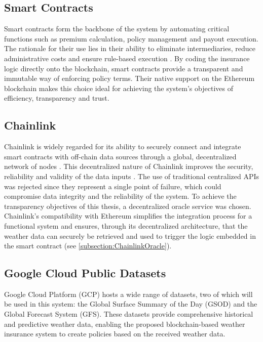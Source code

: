 \subsection{Smart Contracts}
Smart contracts form the backbone of the system by automating critical functions such as premium calculation, policy management and payout execution. The rationale for their use lies in their ability to eliminate intermediaries, reduce administrative costs and ensure rule-based execution \autocite{Zheng2019An}. By coding the insurance logic directly onto the blockchain, smart contracts provide a transparent and immutable way of enforcing policy terms. Their native support on the Ethereum blockchain makes this choice ideal for achieving the system's objectives of efficiency, transparency and trust.

\subsection{Chainlink}
Chainlink is widely regarded for its ability to securely connect and integrate smart contracts with off-chain data sources through a global, decentralized network of nodes \autocite{breidenbach2021chainlink}. This decentralized nature of Chainlink improves the security, reliability and validity of the data inputs \autocite{beniiche2020study}. The use of traditional centralized APIs was rejected since they represent a single point of failure, which could compromise data integrity and the reliability of the system. To achieve the transparency objectives of this thesis, a decentralized oracle service was chosen. Chainlink's compatibility with Ethereum simplifies the integration process for a functional system and ensures, through its decentralized architecture, that the weather data can securely be retrieved and used to trigger the logic embedded in the smart contract (see \cref{subsection:ChainlinkOracle}).

\subsection{Google Cloud Public Datasets}
Google Cloud Platform (GCP) hosts a wide range of datasets, two of which will be used in this system: the Global Surface Summary of the Day (GSOD) and the Global Forecast System (GFS). These datasets provide comprehensive historical and predictive weather data, enabling the proposed blockchain-based weather insurance system to create policies based on the received weather data.

